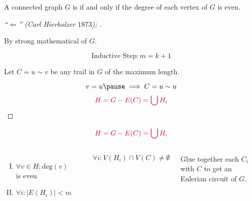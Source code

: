 
\begin{frame}{}
  \begin{theorem}
    A connected graph $G$ is  if and only if the degree of each vertex of $G$ is even.
  \end{theorem}

  \pause
  \begin{proof}[``$\Longleftarrow$'' (Carl Hierholzer $1873$); \pause{}]
    \pause
    \begin{center}
      By strong mathematical  of $G$.
    \end{center}
    \pause
    \[
      \text{Inductive Step}: m = k + 1
    \]

    \pause
    \begin{center}
      Let $C = u \sim v$ be any trail in $G$ of the maximum length.
    \end{center}
    \pause
    \[
      v = u \pause \implies C = u \sim u
    \]
    \pause
    \[
      \textcolor{purple}{H = G - E(C) = \bigcup H_i}
    \]
  \end{proof}
\end{frame}

\begin{frame}{}
  \[
    \textcolor{purple}{H = G - E(C) = \bigcup H_i}
  \]

  \begin{columns}
      \pause
      \begin{enumerate}[(I)]
	\item $\forall v \in H: \text{deg}(v)$ is even
	\item $\forall i: \Big\lvert E(H_i) \Big\rvert < m$
      \end{enumerate}

      \pause
      \vspace{0.30cm}
      \begin{center}
      \end{center}

      \pause
      \[
	\forall i: V(H_i) \cap V(C) \neq \emptyset
      \]

      \pause
      \begin{center}
	Glue together each $C_i$ with $C$ to get an Eulerian circuit of $G$.
      \end{center}
  \end{columns}
\end{frame}
